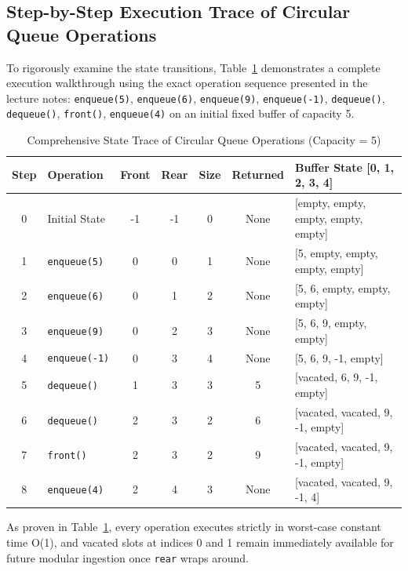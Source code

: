 \documentclass[10pt,journal,compsoc,onecolumn]{IEEEtran}
\begin{document}
\subsection{Step-by-Step Execution Trace of Circular Queue Operations}

To rigorously examine the state transitions, Table~\ref{tab:circular_trace} demonstrates a complete execution walkthrough using the exact operation sequence presented in the lecture notes:
\texttt{enqueue(5)}, \texttt{enqueue(6)}, \texttt{enqueue(9)}, \texttt{enqueue(-1)}, \texttt{dequeue()}, \texttt{dequeue()}, \texttt{front()}, \texttt{enqueue(4)} on an initial fixed buffer of capacity 5.

\begin{table}[htbp]
\centering
\caption{Comprehensive State Trace of Circular Queue Operations (Capacity = 5)}
\label{tab:circular_trace}
\begin{tabular}{cp{2.6cm}ccccp{4.2cm}}
\toprule
\textbf{Step} & \textbf{Operation} & \textbf{Front} & \textbf{Rear} & \textbf{Size} & \textbf{Returned} & \textbf{Buffer State [0, 1, 2, 3, 4]} \\
\midrule
0 & Initial State & -1 & -1 & 0 & None & [empty, empty, empty, empty, empty] \\
1 & \texttt{enqueue(5)} & 0 & 0 & 1 & None & [5, empty, empty, empty, empty] \\
2 & \texttt{enqueue(6)} & 0 & 1 & 2 & None & [5, 6, empty, empty, empty] \\
3 & \texttt{enqueue(9)} & 0 & 2 & 3 & None & [5, 6, 9, empty, empty] \\
4 & \texttt{enqueue(-1)} & 0 & 3 & 4 & None & [5, 6, 9, -1, empty] \\
5 & \texttt{dequeue()} & 1 & 3 & 3 & 5 & [vacated, 6, 9, -1, empty] \\
6 & \texttt{dequeue()} & 2 & 3 & 2 & 6 & [vacated, vacated, 9, -1, empty] \\
7 & \texttt{front()} & 2 & 3 & 2 & 9 & [vacated, vacated, 9, -1, empty] \\
8 & \texttt{enqueue(4)} & 2 & 4 & 3 & None & [vacated, vacated, 9, -1, 4] \\
\bottomrule
\end{tabular}
\end{table}

As proven in Table~\ref{tab:circular_trace}, every operation executes strictly in worst-case constant time O(1), and vacated slots at indices 0 and 1 remain immediately available for future modular ingestion once \texttt{rear} wraps around.
\end{document}
